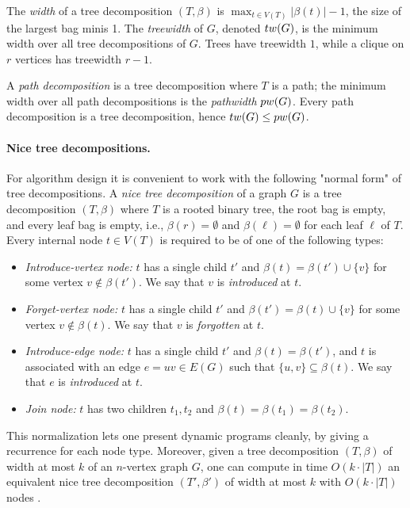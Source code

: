 The \emph{width} of a tree decomposition $(T,\beta)$ is $\max_{t\in V(T)} |\beta(t)| - 1$, the size of the largest bag minis 1. The \emph{treewidth} of $G$, denoted $tw(G)$, is the minimum width over all tree
decompositions of $G$.
Trees have treewidth $1$, while a clique on $r$ vertices has treewidth $r-1$.

A \emph{path decomposition} is a tree decomposition where $T$ is a path; the minimum width
over all path decompositions is the \emph{pathwidth} $pw(G)$.
Every path decomposition is a tree decomposition, hence $tw(G)\le pw(G)$.


\paragraph*{Nice tree decompositions.}
For algorithm design it is convenient to work with the following "normal form" of tree decompositions.
A \emph{nice tree decomposition} of a graph $G$ is a tree decomposition $(T,\beta)$ where
$T$ is a rooted binary tree, the root bag is empty, and every leaf bag is empty, i.e.,
$\beta(r)=\emptyset$ and $\beta(\ell)=\emptyset$ for each leaf $\ell$ of $T$.
Every internal node $t\in V(T)$ is required to be of one of the following types:
\begin{itemize}
    \item \emph{Introduce-vertex node:} $t$ has a single child $t'$ and
    $\beta(t)=\beta(t')\cup\{v\}$ for some vertex $v\notin \beta(t')$.
    We say that $v$ is \emph{introduced} at $t$.

    \item \emph{Forget-vertex node:} $t$ has a single child $t'$ and
    $\beta(t')=\beta(t)\cup\{v\}$ for some vertex $v\notin \beta(t)$.
    We say that $v$ is \emph{forgotten} at $t$.

    \item \emph{Introduce-edge node:} $t$ has a single child $t'$ and
    $\beta(t)=\beta(t')$, and $t$ is associated with an edge $e=uv\in E(G)$ such that
    $\{u,v\}\subseteq \beta(t)$.
    We say that $e$ is \emph{introduced} at $t$.

    \item \emph{Join node:} $t$ has two children $t_1,t_2$ and
    $\beta(t)=\beta(t_1)=\beta(t_2)$.
\end{itemize}
This normalization lets one present dynamic programs cleanly, by giving a recurrence for each
node type. Moreover, given a tree decomposition $(T,\beta)$ of width at most $k$ of an
$n$-vertex graph $G$, one can compute in time $O(k\cdot |T|)$ an equivalent nice tree
decomposition $(T',\beta')$ of width at most $k$ with $O(k\cdot |T|)$ nodes
\cite{BlueBook, Kloks1994Treewidth}.


